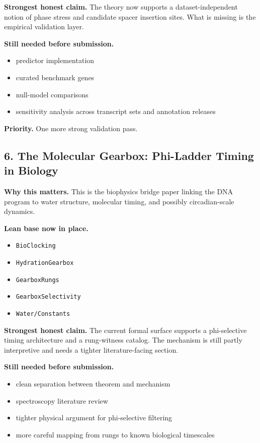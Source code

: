 \documentclass[11pt]{article}
\begin{document}
\textbf{Strongest honest claim.} The theory now supports a dataset-independent notion of phase stress and candidate spacer insertion sites. What is missing is the empirical validation layer.

\textbf{Still needed before submission.}
\begin{itemize}
\item predictor implementation
\item curated benchmark genes
\item null-model comparisons
\item sensitivity analysis across transcript sets and annotation releases
\end{itemize}

\textbf{Priority.} One more strong validation pass.

\subsection*{6. The Molecular Gearbox: Phi-Ladder Timing in Biology}
\textbf{Why this matters.} This is the biophysics bridge paper linking the DNA program to water structure, molecular timing, and possibly circadian-scale dynamics.

\textbf{Lean base now in place.}
\begin{itemize}
\item \texttt{BioClocking}
\item \texttt{HydrationGearbox}
\item \texttt{GearboxRungs}
\item \texttt{GearboxSelectivity}
\item \texttt{Water/Constants}
\end{itemize}

\textbf{Strongest honest claim.} The current formal surface supports a phi-selective timing architecture and a rung-witness catalog. The mechanism is still partly interpretive and needs a tighter literature-facing section.

\textbf{Still needed before submission.}
\begin{itemize}
\item clean separation between theorem and mechanism
\item spectroscopy literature review
\item tighter physical argument for phi-selective filtering
\item more careful mapping from rungs to known biological timescales
\end{itemize}
\end{document}
